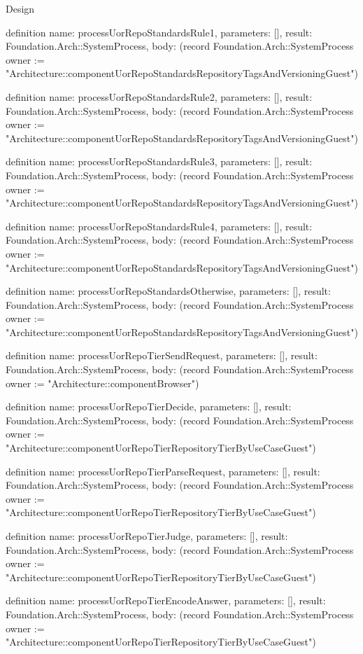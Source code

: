 \begin{lexlean}{Design}
\begin{semanticmodule}
definition{
  name: processUorRepoStandardsRule1,
  parameters: [],
  result: Foundation.Arch::SystemProcess,
  body: (record Foundation.Arch::SystemProcess {owner := "Architecture::componentUorRepoStandardsRepositoryTagsAndVersioningGuest"})
}

definition{
  name: processUorRepoStandardsRule2,
  parameters: [],
  result: Foundation.Arch::SystemProcess,
  body: (record Foundation.Arch::SystemProcess {owner := "Architecture::componentUorRepoStandardsRepositoryTagsAndVersioningGuest"})
}

definition{
  name: processUorRepoStandardsRule3,
  parameters: [],
  result: Foundation.Arch::SystemProcess,
  body: (record Foundation.Arch::SystemProcess {owner := "Architecture::componentUorRepoStandardsRepositoryTagsAndVersioningGuest"})
}

definition{
  name: processUorRepoStandardsRule4,
  parameters: [],
  result: Foundation.Arch::SystemProcess,
  body: (record Foundation.Arch::SystemProcess {owner := "Architecture::componentUorRepoStandardsRepositoryTagsAndVersioningGuest"})
}

definition{
  name: processUorRepoStandardsOtherwise,
  parameters: [],
  result: Foundation.Arch::SystemProcess,
  body: (record Foundation.Arch::SystemProcess {owner := "Architecture::componentUorRepoStandardsRepositoryTagsAndVersioningGuest"})
}

definition{
  name: processUorRepoTierSendRequest,
  parameters: [],
  result: Foundation.Arch::SystemProcess,
  body: (record Foundation.Arch::SystemProcess {owner := "Architecture::componentBrowser"})
}

definition{
  name: processUorRepoTierDecide,
  parameters: [],
  result: Foundation.Arch::SystemProcess,
  body: (record Foundation.Arch::SystemProcess {owner := "Architecture::componentUorRepoTierRepositoryTierByUseCaseGuest"})
}

definition{
  name: processUorRepoTierParseRequest,
  parameters: [],
  result: Foundation.Arch::SystemProcess,
  body: (record Foundation.Arch::SystemProcess {owner := "Architecture::componentUorRepoTierRepositoryTierByUseCaseGuest"})
}

definition{
  name: processUorRepoTierJudge,
  parameters: [],
  result: Foundation.Arch::SystemProcess,
  body: (record Foundation.Arch::SystemProcess {owner := "Architecture::componentUorRepoTierRepositoryTierByUseCaseGuest"})
}

definition{
  name: processUorRepoTierEncodeAnswer,
  parameters: [],
  result: Foundation.Arch::SystemProcess,
  body: (record Foundation.Arch::SystemProcess {owner := "Architecture::componentUorRepoTierRepositoryTierByUseCaseGuest"})
}


\end{semanticmodule}
\end{lexlean}
